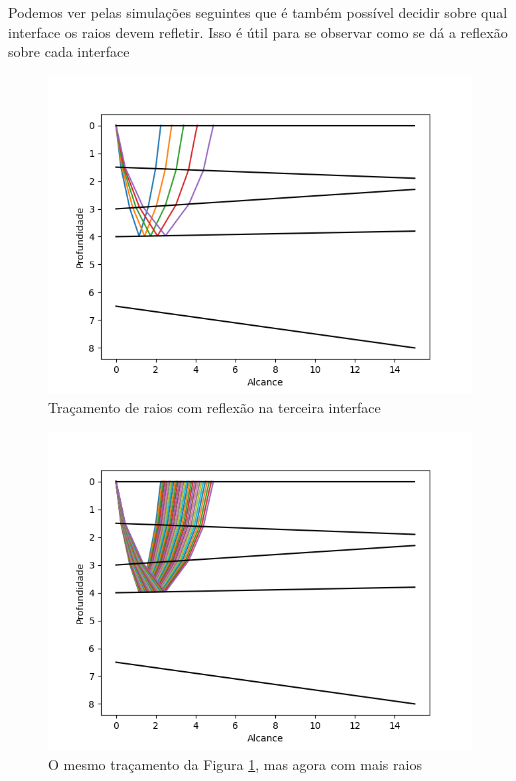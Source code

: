             \newpage
            Podemos ver pelas simulações seguintes que é também possível decidir sobre qual interface os raios devem refletir. Isso é útil para se observar como se dá a reflexão sobre cada interface
            \begin{figure}[H]
               	\centering
               	\label{RTsim03}
               	\includegraphics[scale=.6]{imagens/RTimages/sim03.png}
               	\caption{Traçamento de raios com reflexão na terceira interface}
            \end{figure}
            
			\begin{figure}[H]
               	\centering
               	\label{RTsim04}
               	\includegraphics[scale=.6]{imagens/RTimages/sim04.png}
               	\caption{O mesmo traçamento da Figura \ref{RTsim03}, mas agora com mais raios}
			\end{figure}
            
